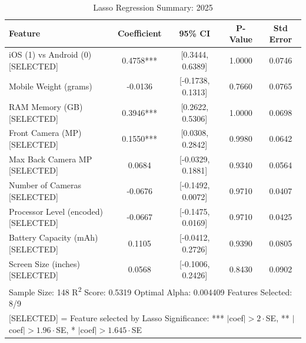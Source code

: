 \documentclass[12pt]{article}
\begin{document}
\begin{table}[ht]
\centering
\caption{Lasso Regression Summary: 2025}
\begin{tabular}{lcccc}
\toprule
Feature & Coefficient & 95\% CI & P-Value & Std Error \\
\midrule
iOS (1) vs Android (0) [SELECTED] & 0.4758*** & {[0.3444, 0.6389]} & 1.0000 & 0.0746 \\
Mobile Weight (grams) & -0.0136 & {[-0.1738, 0.1313]} & 0.7660 & 0.0765 \\
RAM Memory (GB) [SELECTED] & 0.3946*** & {[0.2622, 0.5306]} & 1.0000 & 0.0698 \\
Front Camera (MP) [SELECTED] & 0.1550*** & {[0.0308, 0.2842]} & 0.9980 & 0.0642 \\
Max Back Camera MP [SELECTED] & 0.0684 & {[-0.0329, 0.1881]} & 0.9340 & 0.0564 \\
Number of Cameras [SELECTED] & -0.0676 & {[-0.1492, 0.0072]} & 0.9710 & 0.0407 \\
Processor Level (encoded) [SELECTED] & -0.0667 & {[-0.1475, 0.0169]} & 0.9710 & 0.0425 \\
Battery Capacity (mAh) [SELECTED] & 0.1105 & {[-0.0412, 0.2726]} & 0.9390 & 0.0805 \\
Screen Size (inches) [SELECTED] & 0.0568 & {[-0.1006, 0.2426]} & 0.8430 & 0.0902 \\
\midrule
\multicolumn{5}{l}{\footnotesize Sample Size: 148 \quad R\textsuperscript{2} Score: 0.5319 \quad Optimal Alpha: 0.004409 \quad Features Selected: 8/9} \\
\multicolumn{5}{l}{\footnotesize [SELECTED] = Feature selected by Lasso \quad Significance: *** $|$coef$|>2\cdot$SE, ** $|$coef$|>1.96\cdot$SE, * $|$coef$|>1.645\cdot$SE} \\
\bottomrule
\end{tabular}
\end{table}
\clearpage
\end{document}

